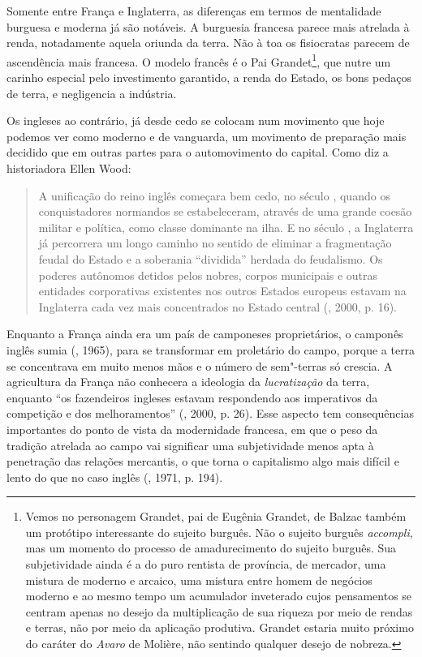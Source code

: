 Somente entre França e Inglaterra, as diferenças em termos de
mentalidade burguesa e moderna já são notáveis. A burguesia francesa
parece mais atrelada à renda, notadamente aquela oriunda da terra. Não à
toa os fisiocratas parecem de ascendência mais francesa. O modelo
francês é o Pai Grandet\footnote{Vemos no personagem Grandet, pai de
  Eugênia Grandet, de Balzac também um protótipo interessante do sujeito
  burguês. Não o sujeito burguês \emph{accompli}, mas um momento do
  processo de amadurecimento do sujeito burguês. Sua subjetividade ainda
  é a do puro rentista de província, de mercador, uma mistura de moderno
  e arcaico, uma mistura entre homem de negócios moderno e ao mesmo
  tempo um acumulador inveterado cujos pensamentos se centram apenas no
  desejo da multiplicação de sua riqueza por meio de rendas e terras,
  não por meio da aplicação produtiva. Grandet estaria muito próximo do
  caráter do \emph{Avaro} de Molière, não sentindo qualquer desejo de
  nobreza.}, que nutre um carinho especial pelo investimento garantido,
a renda do Estado, os bons pedaços de terra, e negligencia a indústria.

Os ingleses ao contrário, já desde cedo se colocam num movimento que
hoje podemos ver como moderno e de vanguarda, um movimento de preparação
mais decidido que em outras partes para o automovimento do capital. Como
diz a historiadora Ellen Wood:

\begin{quote}
A unificação do reino inglês começara bem cedo, no século , quando os
conquistadores normandos se estabeleceram, através de uma grande coesão
militar e política, como classe dominante na ilha. E no século , a
Inglaterra já percorrera um longo caminho no sentido de eliminar a
fragmentação feudal do Estado e a soberania ``dividida'' herdada do
feudalismo. Os poderes autônomos detidos pelos nobres, corpos municipais
e outras entidades corporativas existentes nos outros Estados europeus
estavam na Inglaterra cada vez mais concentrados no Estado central
(, 2000, p. 16).
\end{quote}

Enquanto a França ainda era um país de camponeses proprietários, o
camponês inglês sumia (, 1965), para se transformar em
proletário do campo, porque a terra se concentrava em muito menos mãos e
o número de sem"-terras só crescia. A agricultura da França não conhecera
a ideologia da \emph{lucratização} da terra, enquanto ``os fazendeiros
ingleses estavam respondendo aos imperativos da competição e dos
melhoramentos'' (, 2000, p. 26). Esse aspecto tem consequências
importantes do ponto de vista da modernidade francesa, em que o peso da
tradição atrelada ao campo vai significar uma subjetividade menos apta à
penetração das relações mercantis, o que torna o capitalismo algo mais
difícil e lento do que no caso inglês (, 1971, p. 194).

